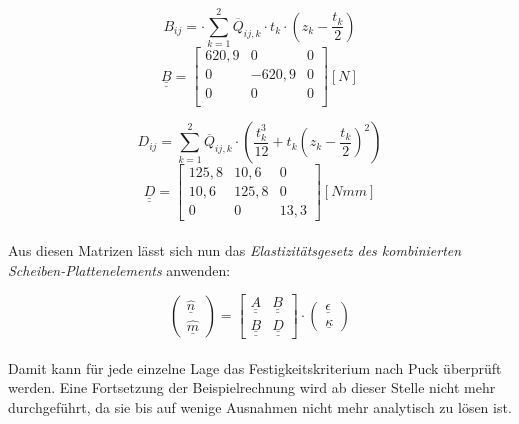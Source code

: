 \begin{equation}
	B_{ij}= \cdot \sum_{k=1}^{2} \overline{Q}_{ij,k}\cdot t_{k}\cdot \left(z_{k}-\frac{t_{k}}{2}\right)
\end{equation}
\begin{equation} \underline{\underline{B}}=
	\begin{bmatrix}
		620,9 & 0 & 0\\
		0 & -620,9 & 0\\	
		0 & 0 & 0\\
	\end{bmatrix} [N]
\end{equation}

\begin{equation} 
	D_{ij}=\sum_{k=1}^{2} \overline{Q}_{ij,k}\cdot \left(\frac{t_{k}^{3}}{12}+t_{k}\left(z_{k}-\frac{t_{k}}{2}\right)^{2}\right)
\end{equation}
\begin{equation}\underline{\underline{D}}=
	\begin{bmatrix}
		125,8 & 10,6 & 0\\
		10,6 & 125,8 & 0\\
		0 & 0 & 13,3
	\end{bmatrix} [Nmm]
\end{equation}\\

\noindent Aus diesen Matrizen lässt sich nun das \textit{ Elastizitätsgesetz des kombinierten Scheiben-Plattenelements} anwenden:

\begin{equation}
	\begin{pmatrix}
		\hat{\underline{n}}\\
		\hat{\underline{m}}
	\end{pmatrix}
	= \begin{bmatrix}
		\underline{\underline{A}}&\underline{\underline{B}}\\
		\underline{\underline{B}}&\underline{\underline{D}}
	\end{bmatrix}
	\cdot \begin{pmatrix}
		\underline{\epsilon}\\
		\underline{\kappa}
	\end{pmatrix}
\end{equation}\\

\noindent Damit kann für jede einzelne Lage das Festigkeitskriterium nach Puck überprüft werden. Eine Fortsetzung der Beispielrechnung wird ab dieser Stelle nicht mehr durchgeführt, da sie bis auf wenige Ausnahmen nicht mehr analytisch zu lösen ist.\\

